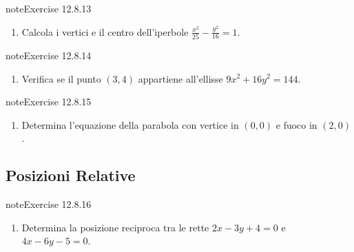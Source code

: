 \documentclass[letterpaper,10pt,italian]{jupyterBook}
\begin{document}
\begin{sphinxadmonition}{note}{Exercise 12.8.13}


\begin{enumerate}
%
\setcounter{enumi}{12}
\item {} 
\sphinxAtStartPar
Calcola i vertici e il centro dell’iperbole \( \frac{x^2}{25} - \frac{y^2}{16} = 1 \).

\end{enumerate}
\end{sphinxadmonition}
 \label{exercise:ch/analytic_geometry/analytic_geometry_2d/sol-exercise-13}

\begin{sphinxadmonition}{note}{Exercise 12.8.14}


\begin{enumerate}
%
\setcounter{enumi}{13}
\item {} 
\sphinxAtStartPar
Verifica se il punto \( (3, 4) \) appartiene all’ellisse \( 9x^2 + 16y^2 = 144 \).

\end{enumerate}
\end{sphinxadmonition}
 \label{exercise:ch/analytic_geometry/analytic_geometry_2d/sol-exercise-14}

\begin{sphinxadmonition}{note}{Exercise 12.8.15}


\begin{enumerate}
%
\setcounter{enumi}{14}
\item {} 
\sphinxAtStartPar
Determina l’equazione della parabola con vertice in \( (0, 0) \) e fuoco in \( (2, 0) \).

\end{enumerate}
\end{sphinxadmonition}


\subsection{Posizioni Relative}
\label{\detokenize{ch/analytic_geometry/analytic_geometry_2d/sol:posizioni-relative}} \label{exercise:ch/analytic_geometry/analytic_geometry_2d/sol-exercise-15}

\begin{sphinxadmonition}{note}{Exercise 12.8.16}


\begin{enumerate}
%
\setcounter{enumi}{15}
\item {} 
\sphinxAtStartPar
Determina la posizione reciproca tra le rette \( 2x - 3y + 4 = 0 \) e \( 4x - 6y - 5 = 0 \).

\end{enumerate}
\end{sphinxadmonition}
 \label{exercise:ch/analytic_geometry/analytic_geometry_2d/sol-exercise-16}
\end{document}
